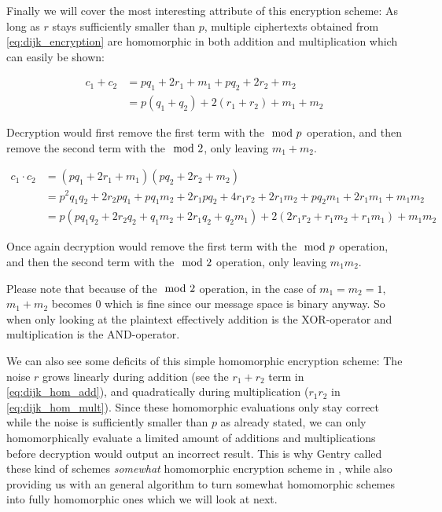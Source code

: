 Finally we will cover the most interesting attribute of this encryption scheme: As long as $r$ stays sufficiently smaller than $p$, multiple ciphertexts obtained from \ref{eq:dijk_encryption} are homomorphic in both addition and multiplication which can easily be shown:

\begin{equation}
    \begin{aligned}
        c_1 + c_2 &= pq_1 + 2 r_1 + m_1 + pq_2 + 2 r_2 + m_2 \\
                &=p \left( q_1 + q_2 \right) + 2 \left( r_1 + r_2 \right) + m_1 + m_2
    \end{aligned}
    \label{eq:dijk_hom_add}
\end{equation}

Decryption would first remove the first term with the $\ \mathrm{mod}\ p$ operation, and then remove the second term with the $\ \mathrm{mod}\ 2$, only leaving $m_1 + m_2$.

\begin{equation}
    \begin{aligned}
        c_1 \cdot c_2 &= \left(pq_1 + 2r_1 + m_1 \right) \left( pq_2 + 2r_2 + m_2 \right) \\
                    &= p^2 q_1 q_2 + 2 r_2 pq_1 + pq_1m_2 + 2r_1pq_2 + 4r_1r_2 + 2r_1m_2 + pq_2m_1 + 2r_1m_1 + m_1m_2\\
                    &= p\left(pq_1q_2 + 2r_2q_2 + q_1m_2 + 2r_1q_2 + q_2m_1\right) + 2\left( 2r_1 r_2 + r_1m_2 + r_1 m_1 \right) + m_1 m_2
    \end{aligned}
    \label{eq:dijk_hom_mult}
\end{equation}

Once again decryption would remove the first term with the $\ \mathrm{mod}\ p$ operation, and then the second term with the $\ \mathrm{mod}\ 2$ operation, only leaving $m_1 m_2$.

Please note that because of the $\ \mathrm{mod}\ 2$ operation, in the case of $m_1 = m_2 = 1$, $m_1 + m_2$ becomes $0$ which is fine since our message space is binary anyway. So when only looking at the plaintext effectively addition is the XOR-operator and multiplication is the AND-operator.

We can also see some deficits of this simple homomorphic encryption scheme: The noise $r$ grows linearly during addition (see the $r_1 + r_2$ term in \ref{eq:dijk_hom_add}), and quadratically during multiplication ($r_1r_2$ in \ref{eq:dijk_hom_mult}). Since these homomorphic evaluations only stay correct while the noise is sufficiently smaller than $p$ as already stated, we can only homomorphically evaluate a limited amount of additions and multiplications before decryption would output an incorrect result. This is why Gentry called these kind of schemes \emph{somewhat} homomorphic encryption scheme in \cite{gentry_fully_2009}, while also providing us with an general algorithm to turn somewhat homomorphic schemes into fully homomorphic ones which we will look at next.

